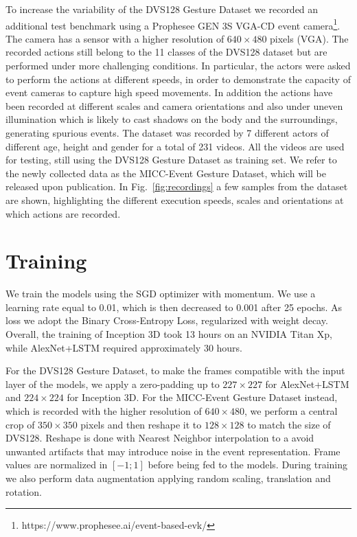 \documentclass[a4paper,conference]{IEEEtran}
\begin{document}
To increase the variability of the DVS128 Gesture Dataset we recorded an additional test benchmark using a Prophesee GEN 3S VGA-CD event camera\footnote{https://www.prophesee.ai/event-based-evk/}. The camera has a sensor with a higher resolution of $640 \times 480$ pixels (VGA). The recorded actions still belong to the 11 classes of the DVS128 dataset but are performed under more challenging conditions. In particular, the actors were asked to perform the actions at different speeds, in order to demonstrate the capacity of event cameras to capture high speed movements. In addition the actions have been recorded at different scales and camera orientations and also under uneven illumination which is likely to cast shadows on the body and the surroundings, generating spurious events.
The dataset was recorded by 7 different actors of different age, height and gender for a total of 231 videos. All the videos are used for testing, still using the DVS128 Gesture Dataset as training set.
We refer to the newly collected data as the MICC-Event Gesture Dataset, which will be released upon publication.
In Fig.~\ref{fig:recordings} a few samples from the dataset are shown, highlighting the different execution speeds, scales and orientations at which actions are recorded.

\section{Training}
\label{sec:training}
We train the models using the SGD optimizer with momentum. We use a learning rate equal to 0.01, which is then decreased to 0.001 after 25 epochs. As loss we adopt the Binary Cross-Entropy Loss, regularized with weight decay. Overall, the training of Inception 3D took 13 hours on an NVIDIA Titan Xp, while AlexNet+LSTM required approximately 30 hours.

For the DVS128 Gesture Dataset, to make the frames compatible with the input layer of the models, we apply a zero-padding up to $227\times227$ for AlexNet+LSTM and $224 \times224$ for Inception 3D. For the MICC-Event Gesture Dataset instead, which is recorded with the higher resolution of $640 \times 480$, we perform a central crop of $350 \times 350$ pixels and then reshape it to $128 \times 128$ to match the size of DVS128. Reshape is done with Nearest Neighbor interpolation to a avoid unwanted artifacts that may introduce noise in the event representation.
Frame values are normalized in $[-1; 1]$ before being fed to the models.
During training we also perform data augmentation applying random scaling, translation and rotation.
\end{document}
